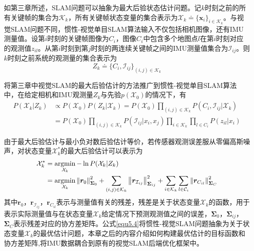 如第三章所述，SLAM问题可以抽象为最大后验状态估计问题。记$k$时刻之前的所有关键帧的集合为$\mathcal{K}_k$，所有关键帧状态变量的集合表示为$\mathcal{X}_k \doteq \{\boldsymbol{x}_i\}_{i \in \mathcal{K}_k}$。与视觉SLAM问题不同，惯性-视觉单目SLAM算法输入不仅包括相机图像，还有IMU测量值。设第$i$时刻的关键帧图像为$C_i$，图像$C_i$中包含多个地图点$l$在第$i$时刻对应的观测值$z_{il}$。从第$i$时刻到第$j$时刻的两连续关键帧之间的IMU测量值集合为$\mathcal{I}_{ij}$。则$k$时刻之前系统的观测量的集合表示为
\begin{equation}
\label{equ5.2}
Z_k \doteq \{C_i,\mathcal{I}_{ij}\}_{(i,j) \in \mathcal{K}_k}
\end{equation}

将第三章中视觉SLAM的最大后验估计的方法推广到惯性-视觉单目SLAM算法中，在给定相机和IMU观测量$Z_k$与先验$p(\mathcal{X}_0)$的情况下，有
\begin{equation}
\label{equ5.3}
\begin{aligned}
P(\mathcal{X}_k | Z_k) & \varpropto P(\mathcal{X}_0)P(Z_k | \mathcal{X}_k) = P(\mathcal{X}_0) \prod\limits_{(i,j) \in \mathcal{K}_k} \! P \left( C_i,\mathcal{I}_{ij} | \mathcal{X}_k \right) \\
&=P(\mathcal{X}_0) \prod\limits_{(i,j) \in \mathcal{K}_k} P \left( \mathcal{I}_{ij} | x_i,x_j \right) \prod\limits_{i \in \mathcal{K}_k} \prod\limits_{l \in C_i}  P \left( z_{il} | x_i \right)
\end{aligned}
\end{equation}

由于最大后验估计与最小负对数后验估计等价，若传感器观测误差服从零偏高斯噪声，对状态变量$\mathcal{X}_k^*$的最大后验估计可以表示为
\begin{equation}
\label{equ5.4}
\begin{aligned}
\mathcal{X}_k^* & = \operatorname*{argmin}\limits_{\mathcal{X}_k}- \ln P(\mathcal{X}_k | Z_k) \\ 
& = \operatorname*{argmin}\limits_{\mathcal{X}_k} \left\Vert \boldsymbol{r}_0 \right\Vert_{\boldsymbol{\Sigma}_0}^2+ \sum\limits_{(i,j) \in \mathcal{K}_k}\left\Vert \boldsymbol{r}_{\mathcal{I}_{ij}} \right\Vert_{\boldsymbol{\Sigma}_{ij}}^2+ \sum\limits_{i \in \mathcal{K}_k}\sum\limits_{l \in \mathcal{C}_i} \left\Vert \boldsymbol{r}_{C_{il}} \right\Vert_{\boldsymbol{\Sigma}_{C}}^2
\end{aligned}
\end{equation}
其中$\boldsymbol{r}_0$，$ \boldsymbol{r}_{\mathcal{I}_{ij}}$，$\boldsymbol{r}_{C_{il}}$表示与测量值有关的残差，残差是关于状态变量$\mathcal{X}_k$的函数，用于表示实际测量值与在状态变量$\mathcal{X}_k$给定情况下预测观测值之间的误差，$\boldsymbol{\Sigma}_0$，$ \boldsymbol{\Sigma}_{ij}$，$\boldsymbol{\Sigma}_C$表示残差对应的协方差矩阵。公式\eqref{equ5.4}将惯性-视觉SLAM问题抽象为关于状态变量$\mathcal{X}_k$的最优估计问题，本章之后的内容介绍如何构建最优估计的目标函数和协方差矩阵,将IMU数据耦合到原有的视觉SLAM后端优化框架中。


